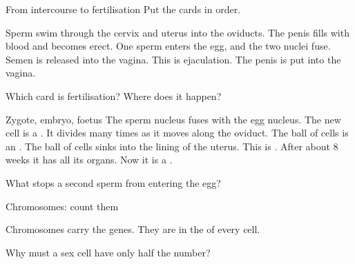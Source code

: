 \documentclass[aspectratio=169,11pt,xcolor=table]{beamer}
\begin{document}
\begin{frame}{From intercourse to fertilisation}
\relax
Put the cards in order.\par\vspace{1mm}
 Sperm swim through the cervix and uterus into the oviducts.
 The penis fills with blood and becomes erect.
 One sperm enters the egg, and the two nuclei fuse.
 Semen is released into the vagina. This is ejaculation.
 The penis is put into the vagina.
\par\vspace{3mm}
Which card is fertilisation? Where does it happen?
\end{frame}

\begin{frame}{Zygote, embryo, foetus}
\relax
{} The sperm nucleus fuses with the egg nucleus. The new cell is a \gap[22mm].
 It divides many times as it moves along the oviduct. The ball of cells is an \gap[22mm].
 The ball of cells sinks into the lining of the uterus. This is \gap[32mm].
 After about 8 weeks it has all its organs. Now it is a \gap[22mm].
\par\vspace{3mm}
What stops a second sperm from entering the egg?
\end{frame}

\begin{frame}{Chromosomes: count them}
\relax
\vspace{2mm}
\FigChromo{\gap}{\gap}{\gap}{\gap}\par\vspace{4mm}
Chromosomes carry the genes. They are in the \gap[24mm] of every cell.\par\vspace{2mm}
Why must a sex cell have only half the number?
\end{frame}
\end{document}
